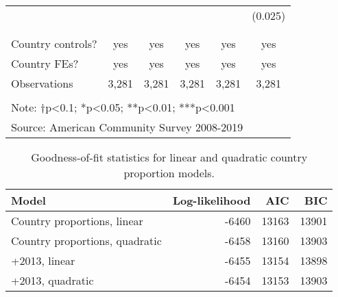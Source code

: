 \documentclass[
  11pt,
]{article}
\begin{document}
\begin{table}[!htbp]
\begin{tabular}{@{\extracolsep{5pt}}lccccc}
  &  &  &  &  & (0.025) \\ 
  & & & & & \\ 
\hline \\[-1.8ex] 
Country controls? & yes & yes & yes & yes & yes \\ 
Country FEs? & yes & yes & yes & yes & yes \\ 
Observations & 3,281 & 3,281 & 3,281 & 3,281 & 3,281 \\ 
\hline 
\hline \\[-1.8ex] 
\multicolumn{6}{l}{Note: †p<0.1; *p<0.05; **p<0.01; ***p<0.001} \\ 
\multicolumn{6}{l}{Source: American Community Survey 2008-2019} \\ 
\end{tabular} 
\end{table}

\begin{table}

\caption{\label{tab:fit}Goodness-of-fit statistics for linear and quadratic country proportion models.}
\centering
\begin{tabular}[t]{lrrr}
\toprule
Model & Log-likelihood & AIC & BIC\\
\midrule
Country proportions, linear & -6460 & 13163 & 13901\\
Country proportions, quadratic & -6458 & 13160 & 13903\\
+2013, linear & -6455 & 13154 & 13898\\
+2013, quadratic & -6454 & 13153 & 13903\\
\bottomrule
\end{tabular}
\end{table}
\end{document}
